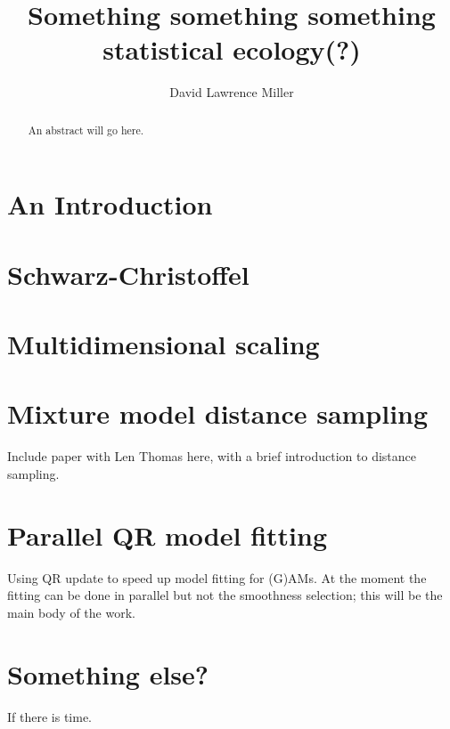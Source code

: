 \documentclass{report}
\title{Something something something statistical ecology(?)}
\author{David Lawrence Miller}
\newcommand{\sch}{Schwarz-Christoffel }
\begin{document}
\maketitle
\begin{abstract} 
An abstract will go here.
\end{abstract}


\tableofcontents

\listoffigures

\chapter{An Introduction}




\chapter{\sch}



\chapter{Multidimensional scaling}

\chapter{Mixture model distance sampling}

Include paper with Len Thomas here, with a brief introduction to distance sampling.

\chapter{Parallel QR model fitting}

Using QR update to speed up model fitting for (G)AMs. At the moment the fitting can be done in parallel but not the smoothness selection; this will be the main body of the work.

\chapter{Something else?}

If there is time.



\end{document}
